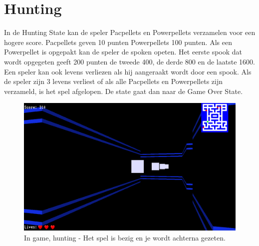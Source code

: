 \documentclass{report}
\begin{document}
  \section{Hunting} %
  \label{sec:hunting}
  In de Hunting State kan de speler Pacpellets en Powerpellets verzamelen voor een hogere score. Pacpellets geven 10 punten Powerpellets 100 punten. Als een Powerpellet is opgepakt kan de speler de spoken opeten. Het eerste spook dat wordt opgegeten geeft 200 punten de tweede 400, de derde 800 en de laatste 1600. Een speler kan ook levens verliezen als hij aangeraakt wordt door een spook. Als de speler zijn 3 levens verliest of als alle Pacpellets en Powerpellets zijn verzameld, is het spel afgelopen. De state gaat dan naar de Game Over State.
  \begin{figure}[h]
      \centering
      \includegraphics[width=.95\textwidth]{technisch verslag imgs/hunting.png}
      \caption{In game, hunting - Het spel is bezig en je wordt achterna gezeten.}
    \end{figure}
\end{document}
